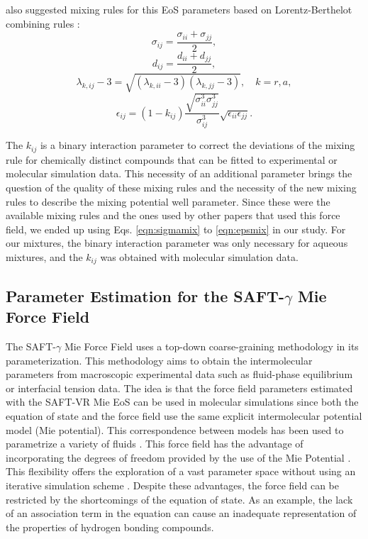 	 also suggested mixing rules for this EoS parameters based on Lorentz-Berthelot combining rules \cite{rowlinson}:
	\begin{equation}
	\sigma_{ij} =\frac{\sigma_{ii}+\sigma_{jj}}{2},
	\label{eqn:sigmamix}
	\end{equation}
	\begin{equation}
	d_{ij} =\frac{d_{ii}+d_{jj}}{2},
	\label{eqn:dmix}
	\end{equation}
	\begin{equation}
	\lambda_{k,ij} -3 =\sqrt{(\lambda_{k,ii}-3)(\lambda_{k,jj}-3)},  \quad k=r,a,
	\label{eqn:lambdamix}
	\end{equation}
	\begin{equation}
	\epsilon_{ij} =(1-k_{ij})\frac{\sqrt{\sigma_{ii}^{3}\sigma_{jj}^{3}}}{\sigma_{ij}^{3}}\sqrt{\epsilon_{ii}\epsilon_{jj}}.
	\label{eqn:epsmix}
	\end{equation}
	
    The $k_{ij}$ is a binary interaction parameter to correct the deviations of the mixing rule for chemically distinct compounds that can be fitted to experimental or molecular simulation data. This necessity of an additional parameter brings the question of the quality of these mixing rules and the necessity of the new mixing rules to describe the mixing potential well parameter. Since these were the available mixing rules and the ones used by other papers that used this force field, we ended up using Eqs. \ref{eqn:sigmamix} to \ref{eqn:epsmix} in our study. For our mixtures, the binary interaction parameter was only necessary for aqueous mixtures, and the $k_{ij}$ was obtained with molecular simulation data.  
    
    
    \subsection{Parameter Estimation for the SAFT-$\gamma$ Mie Force Field}\label{parsaft}
    
    The SAFT-$\gamma$ Mie Force Field uses a top-down coarse-graining methodology in its parameterization. This methodology aims to obtain the intermolecular parameters from macroscopic experimental data such as fluid-phase equilibrium or interfacial tension data. The idea is that the force field parameters estimated with the SAFT-VR Mie EoS can be used in molecular simulations since both the equation of state and the force field use the same explicit intermolecular potential model (Mie potential). This correspondence between models has been used to parametrize a variety of fluids \cite{ervik2016}. This force field has the advantage of incorporating the degrees of freedom provided by the use of the Mie Potential \cite{herdes2015}. This flexibility offers the exploration of a vast parameter space without using an iterative simulation scheme \cite{avendano2011}. Despite these advantages, the force field can be restricted by the shortcomings of the equation of state. As an example, the lack of an association term in the equation can cause an inadequate representation of the properties of hydrogen bonding compounds.
    
